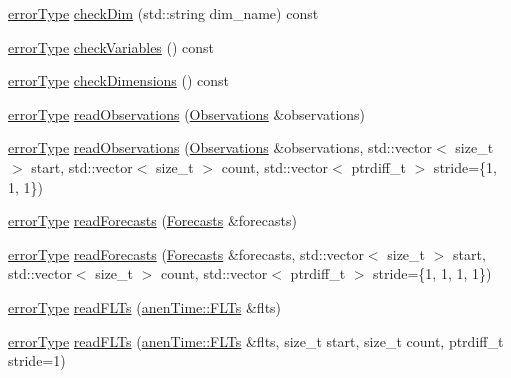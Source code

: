 \begin{DoxyCompactItemize}
\item 
\mbox{\hyperlink{class_an_en_i_o_aa56bc1ec6610b86db4349bce20f9ead0}{error\+Type}} \mbox{\hyperlink{class_an_en_i_o_a60bc1958d57097e308643dad2c9d87d0}{check\+Dim}} (std\+::string dim\+\_\+name) const
\item 
\mbox{\hyperlink{class_an_en_i_o_aa56bc1ec6610b86db4349bce20f9ead0}{error\+Type}} \mbox{\hyperlink{class_an_en_i_o_a44347f497bdf775fcf214ec75d8b6470}{check\+Variables}} () const
\item 
\mbox{\hyperlink{class_an_en_i_o_aa56bc1ec6610b86db4349bce20f9ead0}{error\+Type}} \mbox{\hyperlink{class_an_en_i_o_ab6cd06f6402655924002fec4f83195eb}{check\+Dimensions}} () const
\item 
\mbox{\hyperlink{class_an_en_i_o_aa56bc1ec6610b86db4349bce20f9ead0}{error\+Type}} \mbox{\hyperlink{class_an_en_i_o_a41ebcc0c9edee123626bf6e606917a49}{read\+Observations}} (\mbox{\hyperlink{class_observations}{Observations}} \&observations)
\item 
\mbox{\hyperlink{class_an_en_i_o_aa56bc1ec6610b86db4349bce20f9ead0}{error\+Type}} \mbox{\hyperlink{class_an_en_i_o_adb297d56636fff2db1f5f1af1083897c}{read\+Observations}} (\mbox{\hyperlink{class_observations}{Observations}} \&observations, std\+::vector$<$ size\+\_\+t $>$ start, std\+::vector$<$ size\+\_\+t $>$ count, std\+::vector$<$ ptrdiff\+\_\+t $>$ stride=\{1, 1, 1\})
\item 
\mbox{\hyperlink{class_an_en_i_o_aa56bc1ec6610b86db4349bce20f9ead0}{error\+Type}} \mbox{\hyperlink{class_an_en_i_o_a912e513e58fa258e1dce67ff161abab2}{read\+Forecasts}} (\mbox{\hyperlink{class_forecasts}{Forecasts}} \&forecasts)
\item 
\mbox{\hyperlink{class_an_en_i_o_aa56bc1ec6610b86db4349bce20f9ead0}{error\+Type}} \mbox{\hyperlink{class_an_en_i_o_a5a66859433f123352fbd1f0ba606363c}{read\+Forecasts}} (\mbox{\hyperlink{class_forecasts}{Forecasts}} \&forecasts, std\+::vector$<$ size\+\_\+t $>$ start, std\+::vector$<$ size\+\_\+t $>$ count, std\+::vector$<$ ptrdiff\+\_\+t $>$ stride=\{1, 1, 1, 1\})
\item 
\mbox{\hyperlink{class_an_en_i_o_aa56bc1ec6610b86db4349bce20f9ead0}{error\+Type}} \mbox{\hyperlink{class_an_en_i_o_aa58735032dd6f54c83d6450842922d3f}{read\+F\+L\+Ts}} (\mbox{\hyperlink{classanen_time_1_1_f_l_ts}{anen\+Time\+::\+F\+L\+Ts}} \&flts)
\item 
\mbox{\hyperlink{class_an_en_i_o_aa56bc1ec6610b86db4349bce20f9ead0}{error\+Type}} \mbox{\hyperlink{class_an_en_i_o_a521772f8c969c2fa4ca8ebf1ffa0a460}{read\+F\+L\+Ts}} (\mbox{\hyperlink{classanen_time_1_1_f_l_ts}{anen\+Time\+::\+F\+L\+Ts}} \&flts, size\+\_\+t start, size\+\_\+t count, ptrdiff\+\_\+t stride=1)

\end{DoxyCompactItemize}
